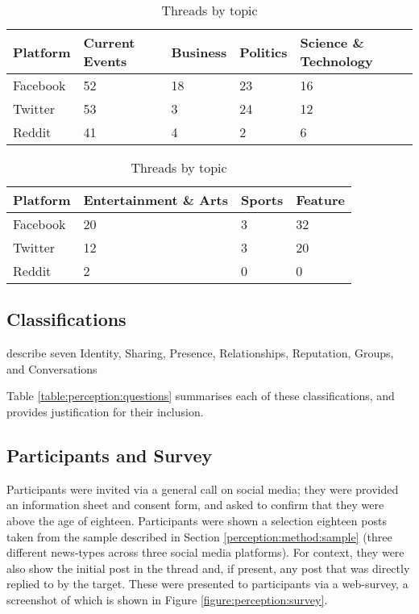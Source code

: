 \begin{table}
\centering
\caption{Threads by topic}
\label{table:perception:topics}
\begin{tabular}{ l | l | l | l | l}
\textbf{Platform} & \textbf{Current Events} & \textbf{Business} & \textbf{Politics} & \textbf{Science \& Technology} \\
\hline
Facebook & 52 & 18 & 23 & 16 \\
\hline
Twitter & 53 & 3 & 24 & 12\\
\hline
Reddit & 41 & 4 & 2 & 6\\
\end{tabular}
\newline
\newline
\begin{tabular}{ l | l | l | l}
\textbf{Platform} & \textbf{Entertainment \& Arts} & \textbf{Sports} & \textbf{Feature}\\
\hline
Facebook & 20 & 3 & 32 \\
\hline
Twitter & 12 & 3 & 20 \\
\hline
Reddit & 2 & 0 & 0 \\
\end{tabular}
\end{table}
 

\subsection{Classifications}


 \citet{kietzmann2011social} describe seven
Identity, Sharing, Presence, Relationships, Reputation, Groups, and Conversations



Table \ref{table:perception:questions} summarises each of these classifications, and provides justification for their inclusion.

\subsection{Participants and Survey}
Participants were invited via a general call on social media; they were provided an information sheet and consent form, and asked to confirm that they were above the age of eighteen. Participants were shown a selection eighteen posts taken from the sample described in Section \ref{perception:method:sample} (three different news-types across three social media platforms). For context, they were also show the initial post in the thread and, if present, any post that was directly replied to by the target. These were presented to participants via a web-survey, a screenshot of which is shown in Figure \ref{figure:perception:survey}.

